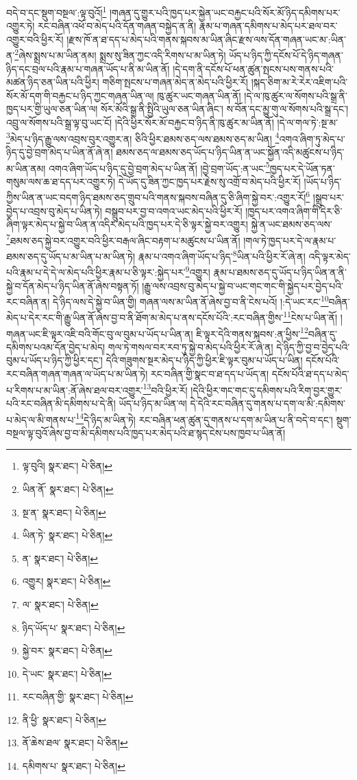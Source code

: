བདེ་བ་དང་སྡུག་བསྔལ་:ལྟ་བུའོ།\footnote{ལྟ་བུའི།  སྣར་ཐང་།  པེ་ཅིན། } །གཞན་དུ་གྱུར་པའི་ཁྱད་པར་སྐྱེན་ཡང་བརྐྱང་པའི་སོར་མོ་ཉིད་དམིགས་པར་འགྱུར་ཏེ། རང་བཞིན་འཕོ་བ་མེད་པའི་དོན་གཞན་བསྐྱེད་ན་ནི། རྣམ་པ་གཞན་དམིགས་པ་མེད་པར་ཐལ་བར་འགྱུར་བའི་ཕྱིར་རོ། །རྫས་ཁོ་ན་ཐ་དད་པ་མེད་པའི་གནས་སྐབས་མ་ཡིན་ཞིང་རྫས་ལས་དོན་གཞན་ཡང་མ་:ཡིན་ན་\footnote{ཡིན་ནོ་  སྣར་ཐང་།  པེ་ཅིན། }ཞེས་སྨྲས་པ་མ་ཡིན་ནམ། སྨྲས་སུ་ཟིན་ཀྱང་འདི་རིགས་པ་མ་ཡིན་ཏེ། ཡོད་པ་ཉིད་ཀྱི་དངོས་པོ་དེ་ཉིད་གཞན་ཉིད་དང་བྲལ་པའི་རྣམ་པ་གཞན་ཡོད་པ་ནི་མ་ཡིན་ནོ། །དེ་དག་ནི་དངོས་པོ་ཕན་ཚུན་སྤངས་པས་གནས་པའི་མཚན་ཉིད་ཅན་ཡིན་པའི་ཕྱིར། གཅིག་སྤངས་པ་གཞན་མེད་ན་མེད་པའི་ཕྱིར་རོ། །སྐད་ཅིག་མ་རེ་རེར་འཇིག་པའི་སོར་མོ་དག་གི་བརྐྱང་པ་ཉིད་ཀྱང་གཞན་ཡིན་ལ། ཁུ་ཚུར་ཡང་གཞན་ཡིན་ནོ། །དེ་ལ་ཁུ་ཚུར་ལ་སོགས་པའི་སྒྲ་ནི་ཁྱད་པར་གྱི་ཡུལ་ཅན་ཡིན་ལ། སོར་མོའི་སྒྲ་ནི་སྤྱིའི་ཡུལ་ཅན་ཡིན་ཞིང་། ས་བོན་དང་མྱུ་གུ་ལ་སོགས་པའི་སྒྲ་དང་། འབྲུ་ལ་སོགས་པའི་སྒྲ་ལྟ་བུ་ཡང་ངོ། །དེའི་ཕྱིར་སོར་མོ་བརྐྱང་བ་ཉིད་ནི་ཁུ་ཚུར་མ་ཡིན་ནོ། །དེ་ལ་གལ་ཏེ་:སྔ་མ་\footnote{སྔ་ན་  སྣར་ཐང་།  པེ་ཅིན། }མེད་པ་ཉིད་རྒྱུ་ལས་འབྲས་བུར་འགྱུར་ན། ཅིའི་ཕྱིར་ཐམས་ཅད་ལས་ཐམས་ཅད་མ་ཡིན། \footnote{ཡིན་ཏེ་  སྣར་ཐང་།  པེ་ཅིན། }འགའ་ཞིག་ཏུ་མེད་པ་ཉིད་དུ་བྱེ་བྲག་མེད་པ་ཡིན་ནོ་ཞེ་ན། ཐམས་ཅད་ལ་ཐམས་ཅད་ཡོད་པ་ཉིད་ཡིན་ན་ཡང་སྐྱོན་འདི་མཚུངས་པ་ཉིད་མ་ཡིན་ནམ། འགའ་ཞིག་ཡོད་པ་ཉིད་དུ་བྱེ་བྲག་མེད་པ་ཡིན་ནོ། །བྱེ་བྲག་ཡོད་:ན་ཡང་\footnote{ན་  སྣར་ཐང་།  པེ་ཅིན། }ཁྱད་པར་དེ་ཡོན་ཏན་གསུམ་ལས་ཆ་ཐ་དད་པར་འགྱུར་ཏེ། དེ་ཡོད་དུ་ཟིན་ཀྱང་ཁྱད་པར་རྗེས་སུ་འགྲོ་བ་མེད་པའི་ཕྱིར་རོ། །ཡོད་པ་ཉིད་ཀྱིས་ཡིན་ན་ཡང་བདག་ཉིད་ཐམས་ཅད་གྲུབ་པའི་གནས་སྐབས་བཞིན་དུ་ཅི་ཞིག་སྐྱེ་བར་:འགྱུར་རོ།\footnote{འགྱུར།  སྣར་ཐང་།  པེ་ཅིན། } །སྒྲུབ་པར་བྱེད་པ་འབྲས་བུ་མེད་པ་ཡིན་ཏེ། བསྒྲུབ་པར་བྱ་བ་འགའ་ཡང་མེད་པའི་ཕྱིར་རོ། །ཁྱད་པར་འགའ་ཞིག་གི་དེར་ཅི་ཞིག་ལྟར་མེད་པ་སྐྱེ་བ་ཡིན་ན་འདིར་མེད་པའི་ཁྱད་པར་དེ་ཅི་ལྟར་སྐྱེ་བར་འགྱུར། སྐྱེ་ན་ཡང་ཐམས་ཅད་ལས་\footnote{ལ་  སྣར་ཐང་།  པེ་ཅིན། }ཐམས་ཅད་སྐྱེ་བར་འགྱུར་བའི་ཕྱིར་བརྒལ་ཞིང་བརྟག་པ་མཚུངས་པ་ཡིན་ནོ། །གལ་ཏེ་ཁྱད་པར་དེ་ལ་རྣམ་པ་ཐམས་ཅད་དུ་ཡོད་པ་མ་ཡིན་པ་མ་ཡིན་ཏེ། རྣམ་པ་འགའ་ཞིག་ཡོད་པ་ཉིད་\footnote{ཉིད་ཡོད་པ་  སྣར་ཐང་།  པེ་ཅིན། }ཡིན་པའི་ཕྱིར་རོ་ཞེ་ན། འདི་ལྟར་མེད་པའི་རྣམ་པ་དེ་དེ་ལ་མེད་པའི་ཕྱིར་རྣམ་པ་ཅི་ལྟར་:སྐྱེད་པར་\footnote{སྐྱེ་བར་  སྣར་ཐང་།  པེ་ཅིན། }འགྱུར། རྣམ་པ་ཐམས་ཅད་དུ་ཡོད་པ་ཉིད་ཡིན་ན་ནི་སྐྱེ་བ་དོན་མེད་པ་ཉིད་ཡིན་ནོ་ཞེས་བསྟན་ཏོ། །རྒྱུ་ལས་འབྲས་བུ་མེད་པ་སྐྱེ་བ་ཡང་གང་གང་གི་སྐྱེད་པར་བྱེད་པའི་རང་བཞིན་ན། དེ་ཉིད་ལས་དེ་སྐྱེ་བ་ཡིན་གྱི། གཞན་ལས་མ་ཡིན་ནོ་ཞེས་བྱ་བ་ནི་ངེས་པའོ། །:དེ་ཡང་རང་\footnote{དེ་ཡང་  སྣར་ཐང་།  པེ་ཅིན། }བཞིན་མེད་པ་དེར་རང་གི་རྒྱུ་ཡིན་ནོ་ཞེས་བྱ་བ་ནི་ཐོག་མ་མེད་པ་ནས་དངོས་པོའི་:རང་བཞིན་གྱིས་\footnote{རང་བཞིན་གྱི་  སྣར་ཐང་།  པེ་ཅིན། }ངེས་པ་ཡིན་ནོ། །གཞན་ཡང་ཇི་ལྟར་འཇི་བའི་གོང་བུ་ལ་བུམ་པ་ཡོད་པ་ཡིན་ན། ཇི་ལྟར་དེའི་གནས་སྐབས་:ན་ཕྱིས་\footnote{ནི་ཕྱི་  སྣར་ཐང་།  པེ་ཅིན། }བཞིན་དུ་དམིགས་པའམ་དོན་བྱེད་པ་མེད། གལ་ཏེ་གསལ་བར་རབ་ཏུ་སྐྱེ་བ་མེད་པའི་ཕྱིར་རོ་ཞེ་ན། དེ་ཉིད་ཀྱི་བྱ་བ་བྱེད་པའི་བུམ་པ་ཡོད་པ་ཉིད་ཀྱི་ཕྱིར་དང་། དེའི་གཟུགས་སྔར་མེད་པ་ཉིད་ཀྱི་ཕྱིར་ཇི་ལྟར་བུམ་པ་ཡོད་པ་ཡིན། དངོས་པོའི་རང་བཞིན་གཞན་གཞན་ལ་ཡོད་པ་མ་ཡིན་ཏེ། རང་བཞིན་གྱི་སྣང་བ་ཐ་དད་པ་ཡོད་ན། དངོས་པོའི་ཐ་དད་པ་མེད་པ་རིགས་པ་མ་ཡིན་:ནོ་ཞེས་ཐལ་བར་འགྱུར་\footnote{ནོ་ཆེས་ཐལ་  སྣར་ཐང་།  པེ་ཅིན། }བའི་ཕྱིར་རོ། །དེའི་ཕྱིར་གང་གང་དུ་དམིགས་པའི་རིག་བྱར་གྱུར་པའི་རང་བཞིན་མི་དམིགས་པ་དེ་ནི། ཡོད་པ་ཉིད་མ་ཡིན་ལ། དེ་དེའི་རང་བཞིན་དུ་གནས་པ་དག་ལ་མི་:དམིགས་པ་མེད་ལ་མི་གནས་པ་\footnote{དམིགས་པ་  སྣར་ཐང་།  པེ་ཅིན། }དེ་ཉིད་མ་ཡིན་ཏེ། རང་བཞིན་ཕན་ཚུན་དུ་གནས་པ་དག་མ་ཡིན་པ་ནི་བདེ་བ་དང་། སྡུག་བསྔལ་ལྟ་བུའོ་ཞེས་བྱ་བ་མི་དམིགས་པའི་ཁྱད་པར་མེད་པའི་ཐ་སྙད་ངེས་པས་ཁྱབ་པ་ཡིན་ནོ། 